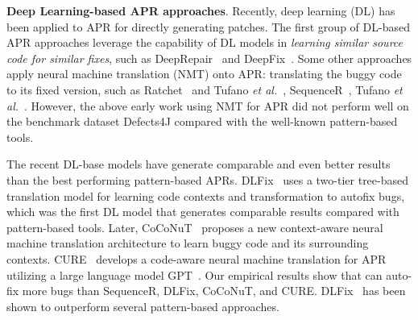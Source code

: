 {\bf Deep Learning-based APR approaches}. Recently, deep learning (DL)
has been applied to APR for directly generating patches. 
 The first group of DL-based APR approaches leverage the capability of DL models
in {\em learning similar source code for similar fixes}, such as DeepRepair~\cite{white2016deep} and DeepFix~\cite{gupta2017deepfix}. 
Some other approaches apply neural machine translation (NMT) onto APR: translating the buggy code to its fixed version, such as Ratchet~\cite{hata2018learning} and Tufano {\em et al.}~\cite{tufano2018empirical}, SequenceR~\cite{chen2018sequencer}, Tufano {\em et al.}~\cite{tufano2019learning}. However, the above early work using NMT for APR did not perform well on the benchmark dataset Defects4J compared with the well-known pattern-based tools. 

The recent DL-base models have generate comparable and even better
results than the best performing pattern-based
APRs. DLFix~\cite{icse20} uses a two-tier tree-based translation model
for learning code contexts and transformation to autofix bugs, which
was the first DL model that generates comparable results compared with
pattern-based tools. Later, CoCoNuT~\cite{lutellier2020coconut}
proposes a new context-aware neural machine translation architecture
to learn buggy code and its surrounding
contexts. CURE~\cite{cure-icse21} develops a code-aware neural machine
translation for APR utilizing a large language model
GPT~\cite{radford2018improving}. Our empirical results show that
{\tool} can auto-fix more bugs than SequenceR, DLFix, CoCoNuT, and
CURE. DLFix~\cite{icse20} has been shown to outperform several
pattern-based approaches.




